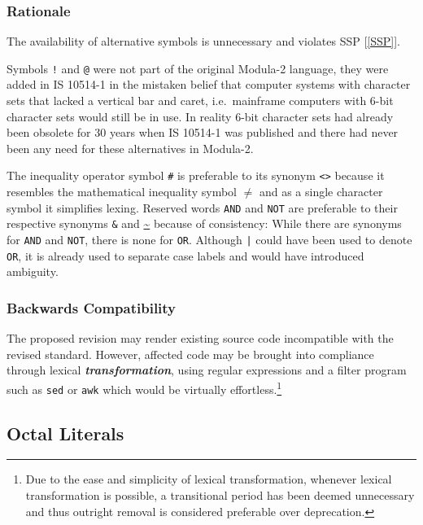 \documentclass[10pt,a4paper,leqno,fleqn]{article}
\renewcommand{\emph}[1]{\textbf{\textit{#1}}}
\begin{document}
\subsubsection{Rationale}

The availability of alternative symbols is unnecessary and violates SSP [\ref{SSP}].

Symbols \verb|!| and \verb|@| were not part of the original Modula-2 language,
they were added in IS 10514-1 in the mistaken belief that computer systems
with character sets that lacked a vertical bar and caret, i.e.\ mainframe computers
with 6-bit character sets would still be in use. In reality 6-bit character sets had
already been obsolete for 30 years when IS 10514-1 was published and there
had never been any need for these alternatives in Modula-2.

The inequality operator symbol \verb|#| is preferable to its synonym \verb|<>|
because it resembles the mathematical inequality symbol \footnotesize
\raisebox{0.35ex} {$\neq$} \normalsize and as a single character symbol it 
simplifies lexing. Reserved words \verb|AND| and \verb|NOT| are preferable to
their respective synonyms \verb|&| and \url{~} because of consistency: While
there are synonyms for \verb|AND| and \verb|NOT|, there is none for \verb|OR|.
Although \verb!|! could have been used to denote \verb|OR|, it is already used
to separate case labels and would have introduced ambiguity.

\subsubsection{Backwards Compatibility}

The proposed revision may render existing source code incompatible with the
revised standard. However, affected code may be brought into compliance through
lexical \emph{transformation}, using regular expressions and a filter program such
as \verb|sed| or \verb|awk| which would be virtually effortless.\footnote
{Due to the ease and simplicity of lexical transformation, whenever lexical
transformation is possible, a transitional period has been deemed unnecessary
and thus outright removal is considered preferable over deprecation.}


\subsection{Octal Literals}
\end{document}

